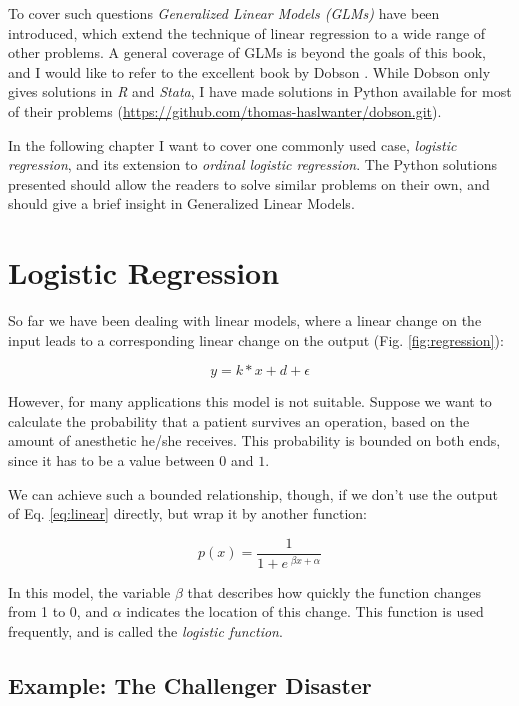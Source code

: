 To cover such questions \emph{Generalized Linear Models (GLMs)} have been introduced, which extend the technique of linear regression to a wide range of other problems. A general coverage of GLMs is beyond the goals of this book, and I would like to refer to the excellent book by Dobson \cite{Dobson2008}. While Dobson only gives solutions in \emph{R} and \emph{Stata}, I have made solutions in Python available for most of their problems (\url{https://github.com/thomas-haslwanter/dobson.git}).

In the following chapter I want to cover one commonly used case, \emph{logistic regression}, and its extension to \emph{ordinal logistic regression}. The Python solutions presented should allow the readers to solve similar problems on their own, and should give a brief insight in Generalized Linear Models.

\section{Logistic Regression}

So far we have been dealing with linear models, where a linear change on the input leads to a corresponding linear change on the output (Fig. \ref{fig:regression}):

 \begin{equation}\label{eq:linear}
   y = k*x + d + \epsilon
 \end{equation}

However, for many applications this model is not suitable. Suppose we want to calculate the probability that a patient survives an operation, based on the amount of anesthetic he/she receives. This probability is bounded on both ends, since it has to be a value between $0$ and $1$.

We can achieve such a bounded relationship, though, if we don't use the output of Eq. \ref{eq:linear} directly, but wrap it by another function:

\begin{equation}\label{eq:logisticFcn}
  p(x) = \frac{1}{ 1 + e^{ \;\beta x + \alpha } }
\end{equation}

In this model, the variable $\beta$ that describes how quickly the function changes from 1 to 0, and $\alpha$ indicates the location of this change. This function is used frequently, and is called the \emph{logistic function}.

\subsection{Example: The Challenger Disaster}

